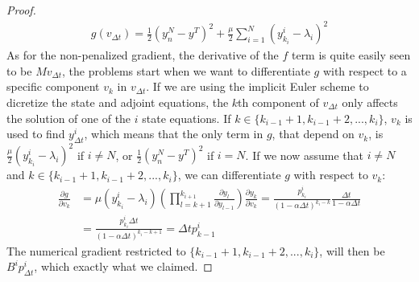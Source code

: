 \begin{proof}
\begin{align*}
g(v_{\Delta t}) = \frac{1}{2}(y_n^N-y^T)^2+\frac{\mu }{2}\sum_{i=1}^{N} (y_{k_i}^{i}-\lambda_i)^2
\end{align*} 
As for the non-penalized gradient, the derivative of the $f$ term is quite easily seen to be $Mv_{\Delta t}$, the problems start when we want to differentiate $g$ with respect to a specific component $v_k$ in $v_{\Delta t}$. If we are using the implicit Euler scheme to dicretize the state and adjoint equations, the $k$th component of $v_{\Delta t}$ only affects the solution of one of the $i$ state equations. If $k\in \{k_{i-1}+1,k_{i-1}+2,...,k_{i}\}$, $v_k$ is used to find $y_{\Delta t}^i$, which means that the only term in $g$, that depend on $v_k$, is  $\frac{\mu }{2}(y_{k_i}^{i}-\lambda_i)^2$ if $i\neq N$, or $\frac{1}{2}(y_n^N-y^T)^2$ if $i=N$. If we now assume that $i\neq N$ and $k\in \{k_{i-1}+1,k_{i-1}+2,...,k_{i}\}$, we can differentiate $g$ with respect to $v_k$:
\begin{align*}
\frac{\partial g}{\partial v_k} &=\mu( y_{k_i}^{i}-\lambda_i) (\prod_{l=k+1}^{k_{i+1}}\frac{\partial y_{l}}{\partial y_{l-1}}) \frac{\partial y_k}{\partial v_{k}} = \frac{p_{k_i}^i}{(1-\alpha\Delta t)^{k_{i}-k}}\frac{\Delta t}{1-\alpha\Delta t} \\
&= \frac{p_{k_i}^i\Delta t}{(1-\alpha\Delta t)^{k_i-k+1}}=\Delta t p_{k-1}^i
\end{align*}
The numerical gradient restricted to $ \{k_{i-1}+1,k_{i-1}+2,...,k_{i}\}$, will then be $B^ip_{\Delta t}^i$, which exactly what we claimed.
\end{proof}
